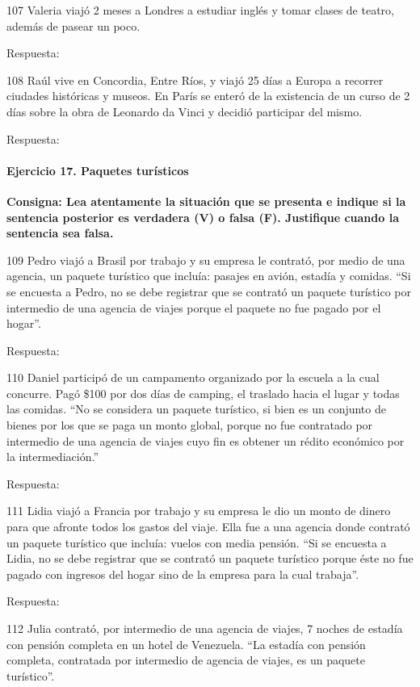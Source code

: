 \documentclass[
  openany]{book}
\begin{document}
107 Valeria viajó 2 meses a Londres a estudiar inglés y tomar clases de teatro, además de pasear un poco.

Respuesta:

108 Raúl vive en Concordia, Entre Ríos, y viajó 25 días a Europa a recorrer ciudades históricas y museos. En París se enteró de la existencia de un curso de 2 días sobre la obra de Leonardo da Vinci y decidió participar del mismo.

Respuesta:

\hypertarget{ejercicio-17.-paquetes-turuxedsticos}{%
\paragraph{Ejercicio 17. Paquetes turísticos}\label{ejercicio-17.-paquetes-turuxedsticos}}

\textbf{Consigna: Lea atentamente la situación que se presenta e indique si la sentencia posterior es verdadera (V) o falsa (F). Justifique cuando la sentencia sea falsa.}

109 Pedro viajó a Brasil por trabajo y su empresa le contrató, por medio de una agencia, un paquete turístico que incluía: pasajes en avión, estadía y comidas. ``Si se encuesta a Pedro, no se debe registrar que se contrató un paquete turístico por intermedio de una agencia de viajes porque el paquete no fue pagado por el hogar''.

Respuesta:

110 Daniel participó de un campamento organizado por la escuela a la cual concurre. Pagó \$100 por dos días de camping, el traslado hacia el lugar y todas las comidas. ``No se considera un paquete turístico, si bien es un conjunto de bienes por los que se paga un monto global, porque no fue contratado por intermedio de una agencia de viajes cuyo fin es obtener un rédito económico por la intermediación.''

Respuesta:

111 Lidia viajó a Francia por trabajo y su empresa le dio un monto de dinero para que afronte todos los gastos del viaje. Ella fue a una agencia donde contrató un paquete turístico que incluía: vuelos con media pensión. ``Si se encuesta a Lidia, no se debe registrar que se contrató un paquete turístico porque éste no fue pagado con ingresos del hogar sino de la empresa para la cual trabaja''.

Respuesta:

112 Julia contrató, por intermedio de una agencia de viajes, 7 noches de estadía con pensión completa en un hotel de Venezuela. ``La estadía con pensión completa, contratada por intermedio de agencia de viajes, es un paquete turístico''.
\end{document}
